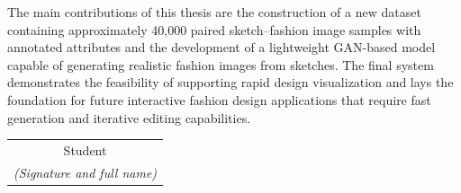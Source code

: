 \documentclass[../main.tex]{subfiles}
\begin{document}
The main contributions of this thesis are the construction of a new dataset containing approximately 40,000 paired sketch–fashion image samples with annotated attributes and the development of a lightweight GAN-based model capable of generating realistic fashion images from sketches. The final system demonstrates the feasibility of supporting rapid design visualization and lays the foundation for future interactive fashion design applications that require fast generation and iterative editing capabilities.
\begin{flushright}
\begin{tabular}{@{}c@{}}
Student\\
\textit{(Signature and full name)}
\end{tabular}
\end{flushright}
\end{document}
